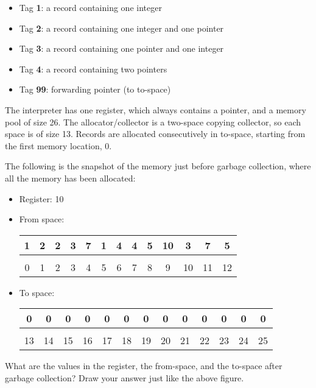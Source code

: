 \begin{enumerate}
  \begin{itemize}
  \item Tag \textbf{1}: a record containing one integer
  \item Tag \textbf{2}: a record containing one integer and one pointer
  \item Tag \textbf{3}: a record containing one pointer and one integer
  \item Tag \textbf{4}: a record containing two pointers
  \item Tag \textbf{99}: forwarding pointer (to to-space)
  \end{itemize}

 The interpreter has one register, which always contains a pointer,
 and a memory pool of size 26. The allocator/collector is a two-space
 copying collector, so each space is of size 13. Records are allocated
 consecutively in to-space, starting from the first memory location,
 0.

 The following is the snapshot of the memory just before garbage collection,
 where all the memory has been allocated:

 \begin{itemize}
 \item Register: 10
 \item From space:
 \begin{tabular}{|c|c|c|c|c|c|c|c|c|c|c|c|@{\hskip0pt}c@{\hskip0pt}|}
  \hline
  1&2&2&3&7&1&4&4&5&10&3&7&5\\
  \hline \multicolumn{1}{c}{}\\[-16pt]
  \multicolumn{1}{c}{\tiny 0}&
  \multicolumn{1}{c}{\tiny 1}&
  \multicolumn{1}{c}{\tiny 2}&
  \multicolumn{1}{c}{\tiny 3}&
  \multicolumn{1}{c}{\tiny 4}&
  \multicolumn{1}{c}{\tiny 5}&
  \multicolumn{1}{c}{\tiny 6}&
  \multicolumn{1}{c}{\tiny 7}&
  \multicolumn{1}{c}{\tiny 8}&
  \multicolumn{1}{c}{\tiny 9}&
  \multicolumn{1}{c}{\tiny 10}&
  \multicolumn{1}{c}{\tiny 11}&
  \multicolumn{1}{c}{\tiny 12}
  \\
 \end{tabular}
 \item To space:
 \begin{tabular}{|c|c|c|c|c|c|c|c|c|c|c|c|@{\hskip0pt}c@{\hskip0pt}|}
  \hline
  0&0&0&0&0&0&0&0&0&0&0&0&0\\
  \hline \multicolumn{1}{c}{}\\[-16pt]
  \multicolumn{1}{c}{\tiny 13}&
  \multicolumn{1}{c}{\tiny 14}&
  \multicolumn{1}{c}{\tiny 15}&
  \multicolumn{1}{c}{\tiny 16}&
  \multicolumn{1}{c}{\tiny 17}&
  \multicolumn{1}{c}{\tiny 18}&
  \multicolumn{1}{c}{\tiny 19}&
  \multicolumn{1}{c}{\tiny 20}&
  \multicolumn{1}{c}{\tiny 21}&
  \multicolumn{1}{c}{\tiny 22}&
  \multicolumn{1}{c}{\tiny 23}&
  \multicolumn{1}{c}{\tiny 24}&
  \multicolumn{1}{c}{\tiny 25}
  \\
 \end{tabular}
 \end{itemize}

What are the values in the register, the from-space, and the to-space after
garbage collection? Draw your answer just like the above figure.

\end{enumerate}
